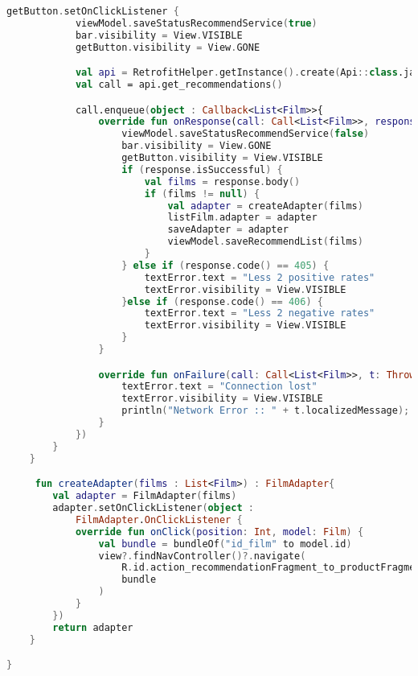 \begin{lstlisting}[language=Kotlin, caption=\leftline{RecommendationFragment}, label=lst:RecommendationFragment]
        getButton.setOnClickListener {
            viewModel.saveStatusRecommendService(true)
            bar.visibility = View.VISIBLE
            getButton.visibility = View.GONE

            val api = RetrofitHelper.getInstance().create(Api::class.java)
            val call = api.get_recommendations()

            call.enqueue(object : Callback<List<Film>>{
                override fun onResponse(call: Call<List<Film>>, response: Response<List<Film>>) {
                    viewModel.saveStatusRecommendService(false)
                    bar.visibility = View.GONE
                    getButton.visibility = View.VISIBLE
                    if (response.isSuccessful) {
                        val films = response.body()
                        if (films != null) {
                            val adapter = createAdapter(films)
                            listFilm.adapter = adapter
                            saveAdapter = adapter
                            viewModel.saveRecommendList(films)
                        }
                    } else if (response.code() == 405) {
                        textError.text = "Less 2 positive rates"
                        textError.visibility = View.VISIBLE
                    }else if (response.code() == 406) {
                        textError.text = "Less 2 negative rates"
                        textError.visibility = View.VISIBLE
                    }
                }

                override fun onFailure(call: Call<List<Film>>, t: Throwable) {
                    textError.text = "Connection lost"
                    textError.visibility = View.VISIBLE
                    println("Network Error :: " + t.localizedMessage);
                }
            })
        }
    }

     fun createAdapter(films : List<Film>) : FilmAdapter{
        val adapter = FilmAdapter(films)
        adapter.setOnClickListener(object :
            FilmAdapter.OnClickListener {
            override fun onClick(position: Int, model: Film) {
                val bundle = bundleOf("id_film" to model.id)
                view?.findNavController()?.navigate(
                    R.id.action_recommendationFragment_to_productFragment,
                    bundle
                )
            }
        })
        return adapter
    }

}
\end{lstlisting}

